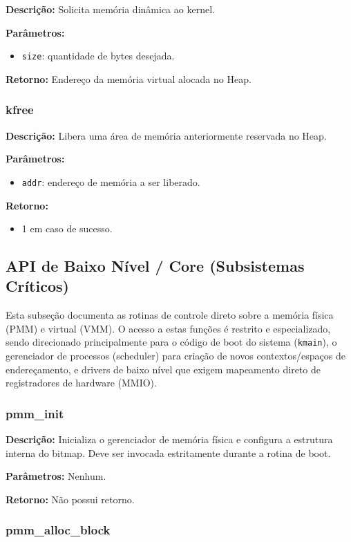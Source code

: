 \textbf{Descrição:}
Solicita memória dinâmica ao kernel.

\textbf{Parâmetros:}
\begin{itemize}
\item \texttt{size}: quantidade de bytes desejada.
\end{itemize}

\textbf{Retorno:}
Endereço da memória virtual alocada no Heap.

\subsubsection{kfree}

\textbf{Descrição:}
Libera uma área de memória anteriormente reservada no Heap.

\textbf{Parâmetros:}
\begin{itemize}
\item \texttt{addr}: endereço de memória a ser liberado.
\end{itemize}

\textbf{Retorno:}
\begin{itemize}
\item 1 em caso de sucesso.
\end{itemize}


\subsection{API de Baixo Nível / Core (Subsistemas Críticos)}
Esta subseção documenta as rotinas de controle direto sobre a memória física (PMM) e virtual (VMM). O acesso a estas funções é restrito e especializado, sendo direcionado principalmente para o código de boot do sistema (\texttt{kmain}), o gerenciador de processos (scheduler) para criação de novos contextos/espaços de endereçamento, e drivers de baixo nível que exigem mapeamento direto de registradores de hardware (MMIO).

\subsubsection{pmm\_init}

\textbf{Descrição:}
Inicializa o gerenciador de memória física e configura a estrutura interna do bitmap. Deve ser invocada estritamente durante a rotina de boot.

\textbf{Parâmetros:}
Nenhum.

\textbf{Retorno:}
Não possui retorno.

\subsubsection{pmm\_alloc\_block}

